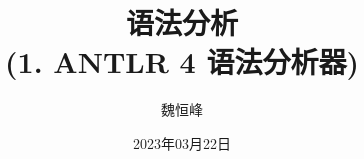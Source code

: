 \documentclass[]{beamer}
\title[语法分析]{语法分析 \\ (1. ANTLR 4 语法分析器)}
\author[魏恒峰]{\large 魏恒峰}
\institute{hfwei@nju.edu.cn}
\date{2023年03月22日}
\begin{document}
\maketitle
% 




\thankyou{}

\end{document}
